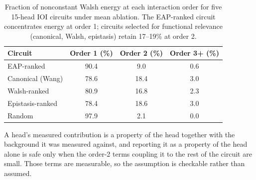 \documentclass{article}
\begin{document}
\begin{table}[h]
\centering
\begin{tabular}{lccc}
\toprule
Circuit & Order 1 (\%) & Order 2 (\%) & Order 3{+} (\%) \\
\midrule
EAP-ranked           & 90.4 & 9.0  & 0.6 \\
Canonical (Wang)     & 78.6 & 18.4 & 3.0 \\
Walsh-ranked         & 80.9 & 16.8 & 2.3 \\
Epistasis-ranked     & 78.4 & 18.6 & 3.0 \\
Random               & 97.9 & 2.1  & 0.0 \\
\bottomrule
\end{tabular}
\caption{Fraction of nonconstant Walsh energy at each interaction order
for five 15-head IOI circuits under mean ablation. The EAP-ranked circuit
concentrates energy at order 1; circuits selected for functional relevance
(canonical, Walsh, epistasis) retain 17--19\% at order 2.}
\label{tab:energy}
\end{table}

A head's measured contribution is a
property of the head together with the background it was measured against, and reporting it
as a property of the head alone is safe only when the order-2 terms coupling it to the rest
of the circuit are small. Those terms are measurable, so the assumption is checkable rather
than assumed.

%
%
%
%
%
\end{document}
